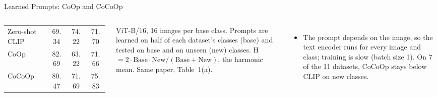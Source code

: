 \begin{frame}{Learned Prompts: CoOp and CoCoOp}
\begin{columns}[T,onlytextwidth]
{\begin{tabular}{l c c c}
        \midrule
        Zero-shot CLIP & 69.34 & 74.22 & 71.70 \\
        CoOp & 82.69 & 63.22 & 71.66 \\
        CoCoOp & 80.47 & 71.69 & 75.83 \\
        \bottomrule
      \end{tabular}\par}
      \vspace{0.2em}
      {\scriptsize ViT-B/16, 16 images per base class. Prompts are learned on half of each dataset's classes (base) and tested on base and on unseen (new) classes. H $= 2\cdot\text{Base}\cdot\text{New}/(\text{Base}+\text{New})$, the harmonic mean. Same paper, Table~1(a).\par}
      \begin{itemize}\scriptsize\itemsep0.2em
        \item The prompt depends on the image, so the text encoder runs for every image and class; training is slow (batch size 1). On 7 of the 11 datasets, CoCoOp stays below CLIP on new classes.
      \end{itemize}
  \end{columns}
\end{frame}

